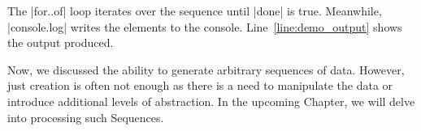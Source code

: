The |for..of| loop iterates over the sequence until |done| is true. Meanwhile,
|console.log| writes the elements to the console.
Line~\ref{line:demo_output} shows the output produced.

Now, we discussed the ability to generate arbitrary sequences of data. However, 
just creation is often not enough as there is a need to manipulate the data or 
introduce additional levels of abstraction. In the upcoming Chapter, we will 
delve into processing such Sequences.
